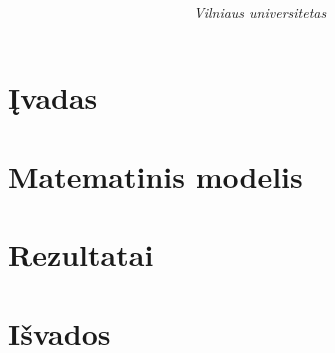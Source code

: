 \documentclass[a4paper,12pt]{article}
\begin{document}
\title{\textbf{}}
\author{%
    \\
    \textit{Vilniaus universitetas}
}
\date{} %
\maketitle

\begin{abstract}

\end{abstract}
\section{Įvadas}

\section{Matematinis modelis}

\section{Rezultatai}

\section{Išvados}
\end{document}
